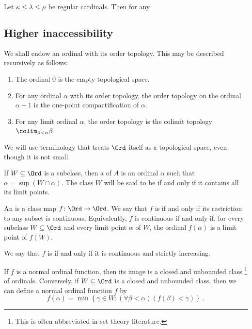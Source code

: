 \begin{eg}
	Let $ \kappa \leq \lambda \leq \mu $ be regular cardinals.
	Then for any 
\end{eg}

\subsection{Higher inaccessibility}%
\label{sub:higher_inaccessibility}

\begin{nul}
	We shall endow an ordinal with its order topology.
	This may be described recursively as follows:
	\begin{enumerate}
		\item The ordinal $ 0 $ is the empty topological space.
		\item For any ordinal $ \alpha $ with its order topology,
			the order topology on the ordinal $ \alpha + 1 $
			is the one-point compactification of $ \alpha $.
		\item For any limit ordinal $ \alpha $,
			the order topology is the colimit topology
			$ \colim_{\beta < \alpha} \beta $.
	\end{enumerate}
\end{nul}

We will use terminology 
that treats $ \Ord $ itself as a topological space,
even though it is not small.

\begin{definition}
	If $ W \subseteq \Ord $ is a subclass,
	then a  of $ A $ is
	an ordinal $ \alpha $ such that $ \alpha = \sup (W \cap \alpha) $.
	The class $ W $ will be said to be  if and only if
	it contains all its limit points.

	An  is a class map $ f \colon \Ord \to \Ord $.
	We say that $ f $ is  if and only if
	its restriction to any subset is continuous.
	Equivalently, $ f $ is continuous if and only if,
	for every subclass $ W \subseteq \Ord $
	and every limit point $ \alpha $ of $ W $,
	the ordinal $ f(\alpha) $ is a limit point of $ f(W) $.

	We say that $ f $ is  if and only if
	it is continuous and strictly increasing.
\end{definition}

\begin{nul}
	If $ f $ is a normal ordinal function,
	then its image is a closed and unbounded class%
	\footnote{This is often abbreviated  in
	set theory literature.}
	of ordinals.
	Conversely, if $ W \subseteq \Ord $ is a closed and unbounded class,
	then we can define a normal ordinal function $ f $ by
	\[
		f(\alpha) =
		\min \left\{ \gamma \in W :
			(\forall \beta < \alpha)(f(\beta) < \gamma) \right\} \period
	\]
\end{nul}

